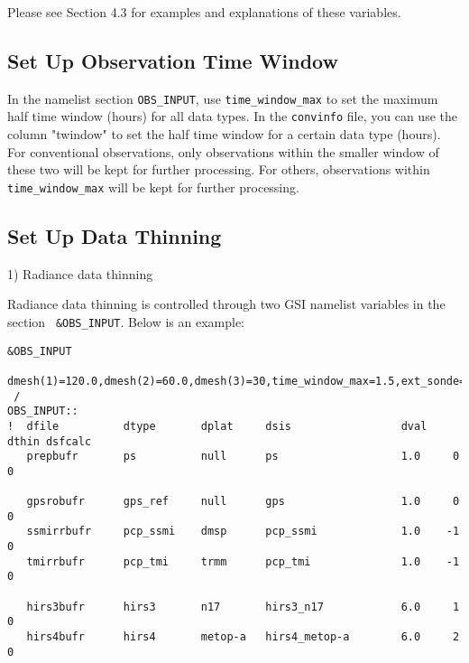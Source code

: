 Please see Section 4.3 for examples and explanations of these variables.

\subsection{Set Up Observation Time Window}

In the namelist section \verb|OBS_INPUT|, use \verb|time_window_max| to set the maximum half time window (hours) for all data types. In the \verb|convinfo| file, you can use the column "twindow" to set the half time window for a certain data type (hours). For conventional observations, only observations within the smaller window of these two will be kept for further processing. For others, observations within \verb|time_window_max| will be kept for further processing.

\subsection{Set Up Data Thinning}

1) Radiance data thinning 

Radiance data thinning is controlled through two GSI namelist variables in the section \verb| &OBS_INPUT|. Below is an example: 

\begin{scriptsize}
\begin{verbatim}
&OBS_INPUT
   dmesh(1)=120.0,dmesh(2)=60.0,dmesh(3)=30,time_window_max=1.5,ext_sonde=.true.,
 /
OBS_INPUT::
!  dfile          dtype       dplat     dsis                 dval    dthin dsfcalc
   prepbufr       ps          null      ps                   1.0     0     0
 
   gpsrobufr      gps_ref     null      gps                  1.0     0     0
   ssmirrbufr     pcp_ssmi    dmsp      pcp_ssmi             1.0    -1     0
   tmirrbufr      pcp_tmi     trmm      pcp_tmi              1.0    -1     0
 
   hirs3bufr      hirs3       n17       hirs3_n17            6.0     1     0
   hirs4bufr      hirs4       metop-a   hirs4_metop-a        6.0     2     0
\end{verbatim}
\end{scriptsize}

